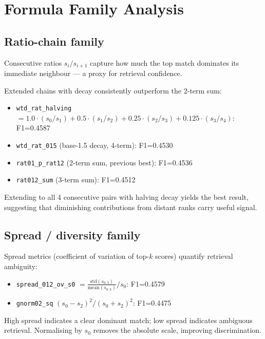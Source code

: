 \documentclass[11pt]{article}
\begin{document}
\section{Formula Family Analysis}
\subsection{Ratio-chain family}
Consecutive ratios $s_i/s_{i+1}$ capture how much the top match dominates
its immediate neighbour --- a proxy for retrieval confidence.

\medskip
\noindent
Extended chains with decay consistently outperform the 2-term sum:

\begin{itemize}
  \item \texttt{wtd\_rat\_halving} $= 1.0\cdot(s_0/s_1) + 0.5\cdot(s_1/s_2)
        + 0.25\cdot(s_2/s_3) + 0.125\cdot(s_3/s_4)$: F1=0.4587
  \item \texttt{wtd\_rat\_015} (base-1.5 decay, 4-term): F1=0.4530
  \item \texttt{rat01\_p\_rat12} (2-term sum, previous best): F1=0.4536
  \item \texttt{rat012\_sum} (3-term sum): F1=0.4512
\end{itemize}

Extending to all 4 consecutive pairs with halving decay yields the best result,
suggesting that diminishing contributions from distant ranks carry useful signal.

\subsection{Spread / diversity family}
Spread metrics (coefficient of variation of top-$k$ scores) quantify retrieval
ambiguity:

\begin{itemize}
  \item \texttt{spread\_012\_ov\_s0} $= \frac{\text{std}(s_{0:3})}{\text{mean}(s_{0:3})} / s_0$: F1=0.4579
  \item \texttt{gnorm02\_sq} $(s_0-s_2)^2/(s_0+s_2)^2$: F1=0.4475
\end{itemize}

High spread indicates a clear dominant match; low spread indicates ambiguous
retrieval. Normalising by $s_0$ removes the absolute scale, improving
discrimination.

\end{document}
